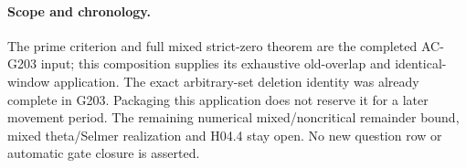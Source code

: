 \paragraph{Scope and chronology.}
The prime criterion and full mixed strict-zero theorem are the
completed AC-G203 input; this composition supplies its exhaustive
old-overlap and identical-window application.
The exact arbitrary-set deletion identity was already complete
in G203. Packaging this application does not reserve it for a
later movement period. The remaining numerical mixed/noncritical
remainder bound, mixed theta/Selmer realization and H04.4 stay open.
No new question row or automatic gate closure is asserted.
